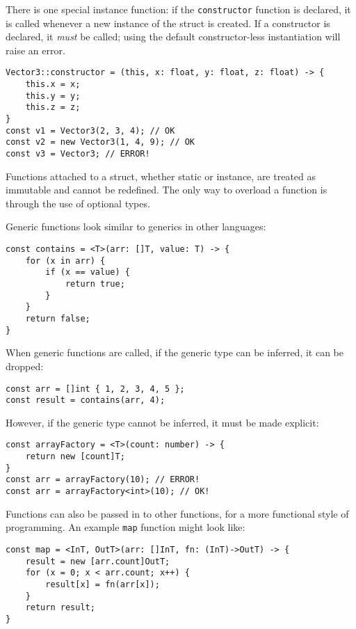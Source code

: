 \documentclass[12pt]{article}
\begin{document}
There is one special instance function: if the \lstinline!constructor! function is declared, it is called whenever a new instance of the struct is created. If a constructor is declared, it \emph{must} be called; using the default constructor-less instantiation will raise an error.

\begin{lstlisting}
Vector3::constructor = (this, x: float, y: float, z: float) -> {
	this.x = x;
	this.y = y;
	this.z = z;
}
const v1 = Vector3(2, 3, 4); // OK
const v2 = new Vector3(1, 4, 9); // OK
const v3 = Vector3; // ERROR!
\end{lstlisting}

Functions attached to a struct, whether static or instance, are treated as immutable and cannot be redefined. The only way to overload a function is through the use of optional types.

Generic functions look similar to generics in other languages:

\begin{lstlisting}
const contains = <T>(arr: []T, value: T) -> {
	for (x in arr) {
		if (x == value) {
			return true;
		}
	}
	return false;
}
\end{lstlisting}

When generic functions are called, if the generic type can be inferred, it can be dropped:

\begin{lstlisting}
const arr = []int { 1, 2, 3, 4, 5 };
const result = contains(arr, 4);
\end{lstlisting}

However, if the generic type cannot be inferred, it must be made explicit:

\begin{lstlisting}
const arrayFactory = <T>(count: number) -> {
	return new [count]T;
}
const arr = arrayFactory(10); // ERROR!
const arr = arrayFactory<int>(10); // OK!
\end{lstlisting}

Functions can also be passed in to other functions, for a more functional style of programming. An example \lstinline!map! function might look like:

\begin{lstlisting}
const map = <InT, OutT>(arr: []InT, fn: (InT)->OutT) -> {
	result = new [arr.count]OutT;
	for (x = 0; x < arr.count; x++) {
		result[x] = fn(arr[x]);
	}
	return result;
}
\end{lstlisting}
\end{document}
